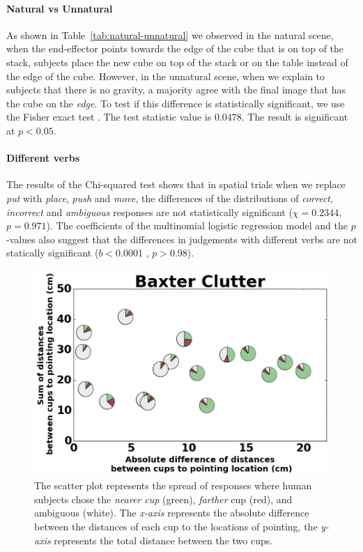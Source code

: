 \documentclass[letterpaper]{article} %
\begin{document}
\paragraph{Natural vs Unnatural}

As shown in Table~\ref{tab:natural-unnatural} we observed in the natural scene, when the end-effector points towards the edge of the cube that is on top of the stack, subjects place the new cube on top of the stack or on the table instead of the edge of the cube. However, in the unnatural scene, when we explain to subjects that there is no gravity, a majority agree with the final image that has the cube on the \textit{edge}. To test if this difference is statistically significant, we use the Fisher exact test %
. 
The test statistic value is $0.0478$. The result is significant at $p < 0.05$. 


\paragraph{Different verbs}
The results of the Chi-squared test shows that in spatial trials when we replace \textit{put} with \textit{place}, \textit{push} and \textit{move}, the differences of the distributions of \textit{correct}, \textit{incorrect} and \textit{ambiguous} responses are not statistically significant ($\chi=0.2344 $, $p = 0.971$). The coefficients of the multinomial logistic regression model and the $p$-values also suggest that the differences in judgements 
with different verbs are not statically significant ($b<0.0001$ , $p>0.98$).


\begin{figure}[ht]
    \centering
    \includegraphics[width=\linewidth]{baxter_Clutter_granular.png}
    \caption{The scatter plot represents the spread of responses where human subjects chose the \textit{nearer cup} (green), \textit{farther} cup (red), and ambiguous (white). The \textit{x-axis} represents the absolute difference between the distances of each cup to the locations of pointing, the \textit{y-axis} represents the total distance between the two cups.}
    \label{fig:cluttered}
\end{figure}
\end{document}
